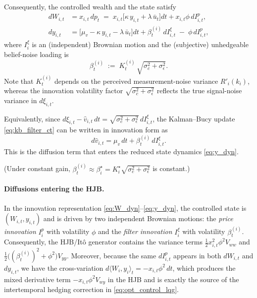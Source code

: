 Consequently, the controlled wealth and the state satisfy
\begin{align}
dW_{i,t} &= x_{i,t}\,dp_t \;=\; x_{i,t}\bigl[\kappa\,y_{i,t}+\lambda\,\bar u_t\bigr]dt
          + x_{i,t}\phi\,dI^p_{i,t}, \label{eq:W_dyn}\\
dy_{i,t} &= \bigl[\mu_v-\kappa\,y_{i,t}-\lambda\,\bar u_t\bigr]dt
          + \beta^{(i)}_t\,dI^\xi_{i,t} \;-\; \phi\,dI^p_{i,t},
\label{eq:y_dyn}
\end{align}
where $I^\xi_i$ is an (independent) Brownian motion and the (subjective) unhedgeable
belief-noise loading is
\begin{equation}
\beta^{(i)}_t \;:=\; K_t^{(i)}\,\sqrt{\sigma_c^2+\sigma_\epsilon^2}.
\label{eq:beta_def}
\end{equation}
Note that $K_t^{(i)}$ depends on the perceived measurement-noise variance $R'_i(k_i)$, whereas the innovation volatility factor $\sqrt{\sigma_c^2+\sigma_\epsilon^2}$ reflects the true signal-noise variance in $d\xi_{i,t}$.

\medskip
Equivalently, since $d\xi_{i,t}-\hat v_{i,t}\,dt=\sqrt{\sigma_c^2+\sigma_\epsilon^2}\,dI^\xi_{i,t}$, the Kalman--Bucy update \eqref{eq:kb_filter_ct} can be written in innovation form as
\[
d\hat v_{i,t}=\mu_v\,dt+\beta^{(i)}_t\,dI^\xi_{i,t}.
\]
This is the diffusion term that enters the reduced state dynamics \eqref{eq:y_dyn}.

(Under constant gain, $\beta^{(i)}_t\approx \beta_i^\star = K_i^\star\sqrt{\sigma_c^2+\sigma_\epsilon^2}$
is constant.)

\paragraph{Diffusions entering the HJB.}
In the innovation representation \eqref{eq:W_dyn}--\eqref{eq:y_dyn}, the controlled state is $(W_{i,t},y_{i,t})$ and is driven by two independent Brownian motions: the \emph{price innovation} $I^p_{i}$ with volatility $\phi$ and the \emph{filter innovation} $I^\xi_{i}$ with volatility $\beta^{(i)}_t$.
Consequently, the HJB/It\^o generator contains the variance terms $\frac12 x_{i,t}^2\phi^2 V_{ww}$ and $\frac12\bigl((\beta^{(i)}_t)^2+\phi^2\bigr)V_{yy}$.
Moreover, because the same $dI^p_{i,t}$ appears in both $dW_{i,t}$ and $dy_{i,t}$, we have the cross-variation
$d\langle W_i,y_i\rangle_t = -x_{i,t}\phi^2\,dt$,
which produces the mixed derivative term $-x_{i,t}\phi^2 V_{wy}$ in the HJB and is exactly the source of the intertemporal hedging correction in \eqref{eq:opt_control_lqg}.


